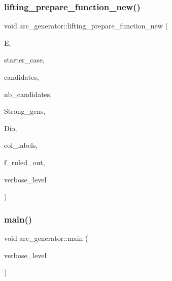 \subsubsection{\texorpdfstring{lifting\+\_\+prepare\+\_\+function\+\_\+new()}{lifting\_prepare\_function\_new()}}
{\footnotesize\ttfamily void arc\+\_\+generator\+::lifting\+\_\+prepare\+\_\+function\+\_\+new (\begin{DoxyParamCaption}\item[{\mbox{\hyperlink{classexact__cover}{exact\+\_\+cover}} $\ast$}]{E,  }\item[{\mbox{\hyperlink{galois_8h_a09fddde158a3a20bd2dcadb609de11dc}{I\+NT}}}]{starter\+\_\+case,  }\item[{\mbox{\hyperlink{galois_8h_a09fddde158a3a20bd2dcadb609de11dc}{I\+NT}} $\ast$}]{candidates,  }\item[{\mbox{\hyperlink{galois_8h_a09fddde158a3a20bd2dcadb609de11dc}{I\+NT}}}]{nb\+\_\+candidates,  }\item[{\mbox{\hyperlink{classstrong__generators}{strong\+\_\+generators}} $\ast$}]{Strong\+\_\+gens,  }\item[{\mbox{\hyperlink{classdiophant}{diophant}} $\ast$\&}]{Dio,  }\item[{\mbox{\hyperlink{galois_8h_a09fddde158a3a20bd2dcadb609de11dc}{I\+NT}} $\ast$\&}]{col\+\_\+labels,  }\item[{\mbox{\hyperlink{galois_8h_a09fddde158a3a20bd2dcadb609de11dc}{I\+NT}} \&}]{f\+\_\+ruled\+\_\+out,  }\item[{\mbox{\hyperlink{galois_8h_a09fddde158a3a20bd2dcadb609de11dc}{I\+NT}}}]{verbose\+\_\+level }\end{DoxyParamCaption})}

\mbox{\label{classarc__generator_ad80140b51b165dad1fe6ab232be7829a}} 
\subsubsection{\texorpdfstring{main()}{main()}}
{\footnotesize\ttfamily void arc\+\_\+generator\+::main (\begin{DoxyParamCaption}\item[{\mbox{\hyperlink{galois_8h_a09fddde158a3a20bd2dcadb609de11dc}{I\+NT}}}]{verbose\+\_\+level }\end{DoxyParamCaption})}

\mbox{\label{classarc__generator_a0e89a29e9434bb47114cf02d7a5cb0a3}} 

